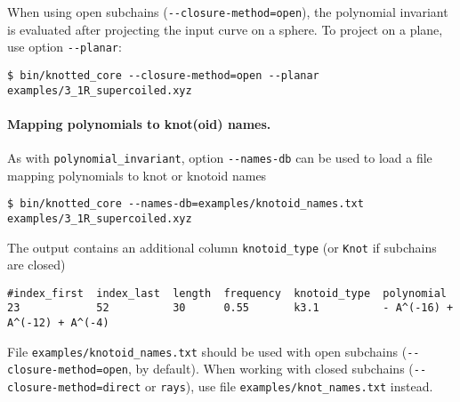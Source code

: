 When using open subchains (\lstinline{--closure-method=open}), the polynomial invariant is evaluated after projecting the input curve on a sphere. To project on a plane, use option \lstinline{--planar}:
\begin{lstlisting}
$ bin/knotted_core --closure-method=open --planar examples/3_1R_supercoiled.xyz
\end{lstlisting}


\paragraph{Mapping polynomials to knot(oid) names.}
As with \lstinline{polynomial_invariant}, option \lstinline{--names-db} can be used to load a file mapping polynomials to knot or knotoid names
\begin{lstlisting}
$ bin/knotted_core --names-db=examples/knotoid_names.txt examples/3_1R_supercoiled.xyz
\end{lstlisting}
The output contains an additional column \lstinline{knotoid_type} (or \lstinline{Knot} if subchains are closed)
\begin{lstlisting}
#index_first  index_last  length  frequency  knotoid_type  polynomial
23            52          30      0.55       k3.1          - A^(-16) + A^(-12) + A^(-4)
\end{lstlisting}
File \lstinline{examples/knotoid_names.txt} should be used with open subchains (\lstinline{--closure-method=open}, by default). When working with closed subchains (\lstinline{--closure-method=direct} or \lstinline{rays}), use file \lstinline{examples/knot_names.txt} instead.

